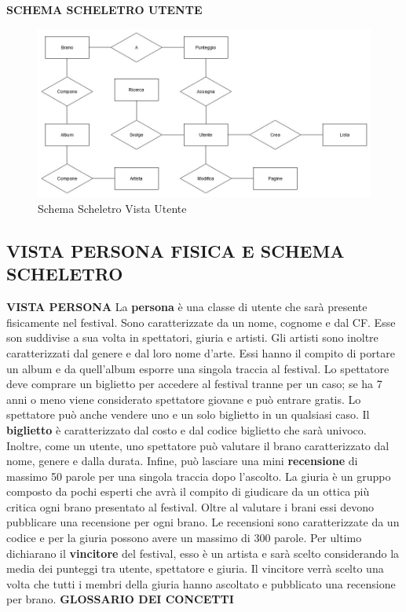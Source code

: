 \documentclass{article}
\begin{document}
\newpage
\noindent\textbf{SCHEMA SCHELETRO UTENTE}
\begin{figure}[h]
    \centering
    \includegraphics[width=1\linewidth]{images/Schema Scheletro Utente.jpg}
    \caption{Schema Scheletro Vista Utente}
    \label{fig:Vista Utente}
\end{figure}











\subsection{VISTA PERSONA FISICA E SCHEMA SCHELETRO}
\textbf{\newline}
\noindent\textbf{VISTA PERSONA}
\newline\newline
La \textbf{persona} è una classe di utente che sarà presente fisicamente nel festival. Sono caratterizzate da un nome, cognome e dal CF. Esse son suddivise a sua volta in spettatori, giuria e artisti. Gli artisti sono inoltre caratterizzati dal genere e dal loro nome d'arte. Essi hanno il compito di portare un album e da quell'album esporre una singola traccia al festival. Lo spettatore deve comprare un biglietto per accedere al festival tranne per un caso; se ha 7 anni o meno viene considerato spettatore giovane e può entrare gratis. Lo spettatore può anche vendere uno e un solo biglietto in un qualsiasi caso. Il \textbf{biglietto} è caratterizzato dal costo e dal codice biglietto che sarà univoco. Inoltre, come un utente, uno spettatore può valutare il brano caratterizzato dal nome, genere e dalla durata. Infine, può lasciare una mini \textbf{recensione} di massimo 50 parole per una singola traccia dopo l'ascolto. La giuria è un gruppo composto da pochi esperti che avrà il compito di giudicare da un ottica più critica ogni brano presentato al festival. Oltre al valutare i brani essi devono pubblicare una recensione per ogni brano. Le recensioni sono caratterizzate da un codice e per la giuria possono avere un massimo di 300 parole. Per ultimo dichiarano il \textbf{vincitore} del festival, esso è un artista e sarà scelto considerando la media dei punteggi tra utente, spettatore e giuria. Il vincitore verrà scelto una volta che tutti i membri della giuria hanno ascoltato e pubblicato una recensione per brano.
\newline
\newline
\textbf{GLOSSARIO DEI CONCETTI}
\end{document}
